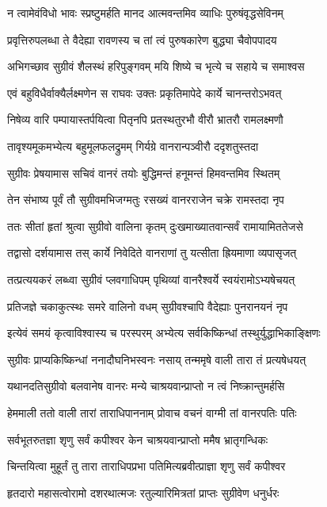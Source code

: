 \twolineshloka
{न त्वामेवंविधो भावः स्प्रष्टुमर्हति मानद}
{आत्मवन्तमिव व्याधिः पुरुषंवृद्धसेविनम्}


\twolineshloka
{प्रवृत्तिरुपलब्धा ते वैदेह्या रावणस्य च}
{तां त्वं पुरुषकारेण बुद्ध्या चैवोपपादय}


\twolineshloka
{अभिगच्छाव सुग्रीवं शैलस्थं हरिपुङ्गवम्}
{मयि शिष्ये च भृत्ये च सहाये च समाश्वस}


\twolineshloka
{एवं बहुविधैर्वाक्यैर्लक्ष्मणेन स राघवः}
{उक्तः प्रकृतिमापेदे कार्ये चानन्तरोऽभवत्}


\twolineshloka
{निषेव्य वारि पम्पायास्तर्पयित्वा पितृनपि}
{प्रतस्थतुरभौ वीरौ भ्रातरौ रामलक्ष्मणौ}


\twolineshloka
{तावृश्यमूकमभ्येत्य बहुमूलफलद्रुमम्}
{गिर्यग्रे वानरान्पञ्वीरौ ददृशतुस्तदा}


\twolineshloka
{सुग्रीवः प्रेषयामास सचिवं वानरं तयोः}
{बुद्धिमन्तं हनूमन्तं हिमवन्तमिव स्थितम्}


\twolineshloka
{तेन संभाष्य पूर्वं तौ सुग्रीवमभिजग्मतुः}
{रसख्यं वानरराजेन चक्रे रामस्तदा नृप}


\twolineshloka
{ततः सीतां हृतां श्रुत्वा सुग्रीवो वालिना कृतम्}
{दुःखमाख्यातवान्सर्वं रामायामिततेजसे}


\twolineshloka
{तद्वासो दर्शयामास तस् कार्ये निवेदिते}
{वानराणां तु यत्सीता ह्रियमाणा व्यपासृजत्}


\twolineshloka
{तत्प्रत्ययकरं लब्ध्वा सुग्रीवं प्लवगाधिपम्}
{पृथिव्यां वानरैश्वर्ये स्वयंरामोऽभ्यषेचयत्}


\twolineshloka
{प्रतिजज्ञे चकाकुत्स्थः समरे वालिनो वधम्}
{सुग्रीवश्चापि वैदेह्याः पुनरानयनं नृप}


\twolineshloka
{इत्येवं समयं कृत्वाविश्वास्य च परस्परम्}
{अभ्येत्य सर्वकिष्किन्धां तस्थुर्युद्धाभिकाङ्क्षिणः}


\twolineshloka
{सुग्रीवः प्राप्यकिष्किन्धां ननादौघनिभस्वनः}
{नसाय् तन्ममृषे वाली तारा तं प्रत्यषेधयत्}


\twolineshloka
{यथानदतिसुग्रीवो बलवानेष वानरः}
{मन्ये चाश्रयवान्प्राप्तो न त्वं निष्क्रान्तुमर्हसि}


\twolineshloka
{हेममाली ततो वाली तारां ताराधिपाननाम्}
{प्रोवाच वचनं वाग्मी तां वानरपतिः पतिः}


\twolineshloka
{सर्वभूतरुतज्ञा शृणु सर्वं कपीश्वर}
{केन चाश्रयवान्प्राप्तो ममैष भ्रातृगन्धिकः}

\twolineshloka
{चिन्तयित्वा मुहूर्तं तु तारा ताराधिपप्रभा}
{पतिमित्यब्रवीत्प्राज्ञा शृणु सर्वं कपीश्वर}


\twolineshloka
{हृतदारो महासत्वोरामो दशरथात्मजः}
{रतुल्यारिमित्रतां प्राप्तः सुग्रीवेण धनुर्धरः}


